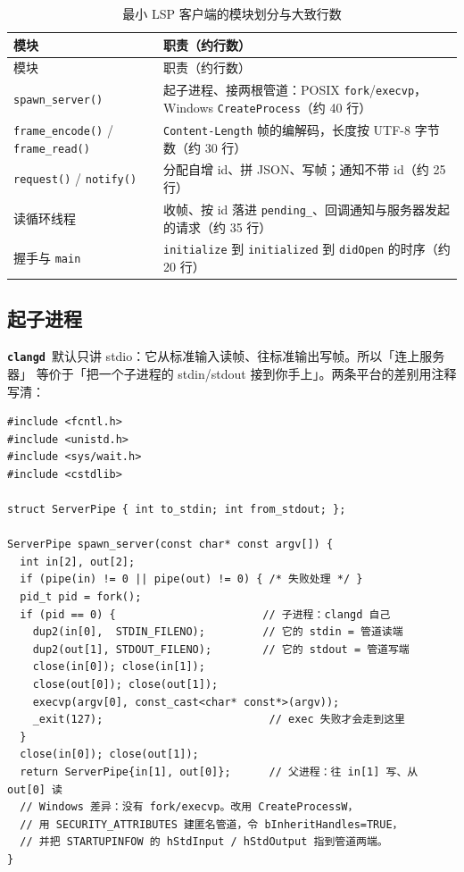 \documentclass[12pt,a4paper,fontset=fandol]{ctexbook}
\newcommand{\Bk}{\discretionary{}{}{}}
\newcommand{\Lib}[1]{\textbf{\texttt{#1}}}
\newcommand{\CD}{\Lib{clangd}}
\begin{document}
{\small\setlength{\tabcolsep}{3pt}
\begin{longtable}{>{\raggedright\arraybackslash}p{} >{\raggedright\arraybackslash}p{}}
\caption{最小 LSP 客户端的模块划分与大致行数}\label{tab:ch08-mod}\\
\toprule
模块 & 职责（约行数） \\
\midrule
\endfirsthead
\toprule
模块 & 职责（约行数） \\
\midrule
\endhead
\bottomrule
\endfoot
\texttt{spawn\_server()} & 起子进程、接两根管道：POSIX \texttt{fork}/{\Bk}\texttt{execvp}，Windows \texttt{CreateProcess}（约 40 行） \\
\texttt{frame\_encode()} / \texttt{frame\_read()} & \texttt{Content-Length} 帧的编解码，长度按 UTF-8 字节数（约 30 行） \\
\texttt{request()} / \texttt{notify()} & 分配自增 id、拼 JSON、写帧；通知不带 id（约 25 行） \\
读循环线程 & 收帧、按 id 落进 \texttt{pending\_}、回调通知与服务器发起的请求（约 35 行） \\
握手与 \texttt{main} & \texttt{initialize} 到 \texttt{initialized} 到 \texttt{didOpen} 的时序（约 20 行） \\
\end{longtable}}

\subsection{起子进程}\label{sec:ch08-s1a}

\CD\ 默认只讲 stdio：它从标准输入读帧、往标准输出写帧。所以「连上服务器」
等价于「把一个子进程的 stdin/stdout 接到你手上」。两条平台的差别用注释写清：

\begin{lstlisting}[style=cppstyle,caption={起 \CD\ 子进程并把 stdio 接到管道（POSIX 实现，Windows 差异见注释）},label={lst:ch08-spawn}]
#include <fcntl.h>
#include <unistd.h>
#include <sys/wait.h>
#include <cstdlib>

struct ServerPipe { int to_stdin; int from_stdout; };

ServerPipe spawn_server(const char* const argv[]) {
  int in[2], out[2];
  if (pipe(in) != 0 || pipe(out) != 0) { /* 失败处理 */ }
  pid_t pid = fork();
  if (pid == 0) {                       // 子进程：clangd 自己
    dup2(in[0],  STDIN_FILENO);         // 它的 stdin = 管道读端
    dup2(out[1], STDOUT_FILENO);        // 它的 stdout = 管道写端
    close(in[0]); close(in[1]);
    close(out[0]); close(out[1]);
    execvp(argv[0], const_cast<char* const*>(argv));
    _exit(127);                          // exec 失败才会走到这里
  }
  close(in[0]); close(out[1]);
  return ServerPipe{in[1], out[0]};      // 父进程：往 in[1] 写、从 out[0] 读
  // Windows 差异：没有 fork/execvp。改用 CreateProcessW，
  // 用 SECURITY_ATTRIBUTES 建匿名管道，令 bInheritHandles=TRUE，
  // 并把 STARTUPINFOW 的 hStdInput / hStdOutput 指到管道两端。
}
\end{lstlisting}
\end{document}
